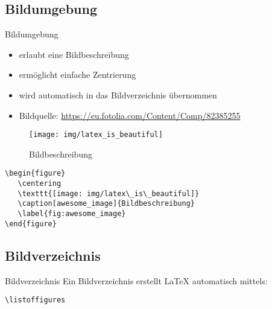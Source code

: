 \subsection{Bildumgebung}
\begin{frame}[fragile]{Bildumgebung}   
\begin{multicols}{2}
\begin{itemize}
\item erlaubt eine Bildbeschreibung
\item ermöglicht einfache Zentrierung
\item wird automatisch in das Bildverzeichnis übernommen
\item Bildquelle: \url{https://eu.fotolia.com/Content/Comp/82385255}
\end{itemize}

\begin{figure}
\centering
\texttt{[image: img/latex\_is\_beautiful]}
\caption[awesome_image]{Bildbeschreibung}
\label{fig:awesome_image}
\end{figure}
\end{multicols}
\vspace{-2ex}
\begin{lstlisting}[style=tex]
\begin{figure}
   \centering
   \texttt{[image: img/latex\_is\_beautiful]}
   \caption[awesome_image]{Bildbeschreibung}
   \label{fig:awesome_image}
\end{figure}\end{lstlisting}
\end{frame}

\subsection{Bildverzeichnis}
\begin{frame}[fragile]{Bildverzeichnis}
Ein Bildverzeichnis erstellt \LaTeX{} automatisch mittels:

\begin{lstlisting}[style=tex]
\listoffigures
\end{lstlisting}

\end{frame}